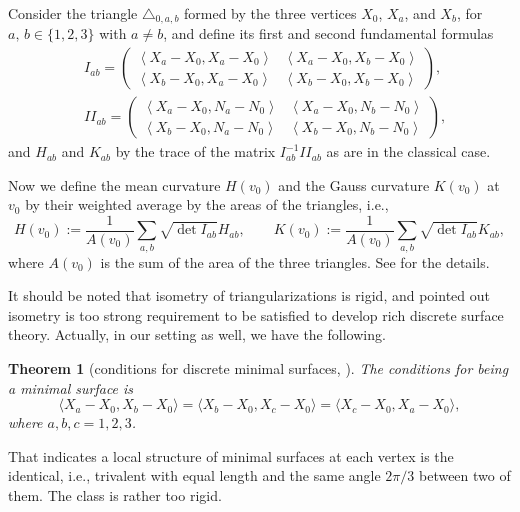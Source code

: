 \documentclass[pdftex]{sigma}
\newcommand{\1}{{\bf 1}}
\newcommand{\inner}[2]{{\left\langle{#1}, {#2}\right\rangle}}
\newcommand{\nai}{\langle}
\newcommand{\seki}{\rangle}
\numberwithin{equation}{section}
\newtheorem{Theorem}{Theorem}[section]
\begin{document}
Consider the triangle $\triangle_{0,a,b}$ formed by the three vertices $X_0$, $X_a$, and $X_b$,
for $a,\,b \in \{1,2,3\}$ with $a\neq b$, and define its first and second fundamental formulas
 \begin{align*}
 & I_{ab}
=
 \begin{pmatrix}
 \inner{X_a-X_0}{X_a-X_0} & \inner{X_a-X_0}{X_b-X_0} \\
 \inner{X_b-X_0}{X_a-X_0} & \inner{X_b-X_0}{X_b-X_0}
 \end{pmatrix},
 \\
 & I\!I_{ab}
 =
 \begin{pmatrix}
 \inner{X_a-X_0}{N_a-N_0} & \inner{X_a-X_0}{N_b-N_0} \\
 \inner{X_b-X_0}{N_a-N_0} & \inner{X_b-X_0}{N_b-N_0}
 \end{pmatrix},
 \end{align*}
and $H_{ab}$ and $K_{ab}$ by the trace of the matrix $I_{ab}^{-1}I\!I_{ab}$ as are in the classical case.

Now we define the mean curvature $H(v_0)$ and the Gauss curvature $K(v_0)$ at $v_0$
by their weighted average by the areas of the triangles,
i.e.,
\[
 H(v_0) := \frac{1}{A(v_0)}\sum_{a,b} \sqrt{\det I_{ab}}H_{ab},
 \qquad
 K(v_0) := \frac{1}{A(v_0)}\sum_{a,b} \sqrt{\det I_{ab}}K_{ab},
 \]
where $A(v_0)$ is the sum of the area of the three triangles.
See \cite{kotani-naito-omori} for the details.

It should be noted that isometry of triangularizations is rigid,
and \cite{lam-pinkall} pointed out isometry is too strong requirement to be satisfied
to develop rich discrete surface theory. Actually, in our setting as well, we have the following.

\begin{Theorem}[conditions for discrete minimal surfaces, \cite{kotani-naito-omori}]
 The conditions for being a minimal surface is
 \begin{displaymath}
 \nai X_a-X_0, X_b- X_0\seki = \nai X_b-X_0, X_c- X_0\seki= \nai X_c-X_0, X_a- X_0\seki,
 \end{displaymath}
 where $a,b,c =1,2,3$.
\end{Theorem}
That indicates a local structure of minimal surfaces at each vertex is the identical,
i.e., trivalent with equal length and the same angle $2\pi/3$ between two of them.
The class is rather too rigid.
\end{document}

